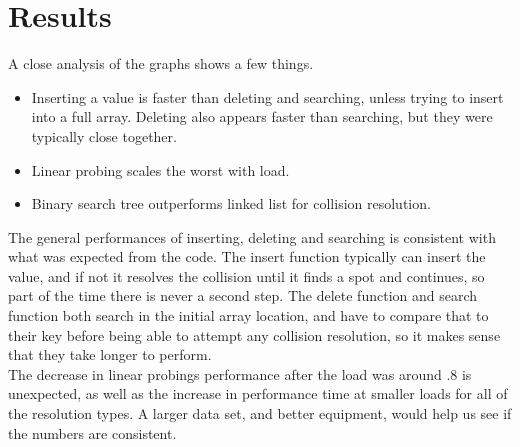 \documentclass[11pt]{article}
\theoremstyle{definition}
\numberwithin{equation}{section}
\begin{document}
\section{Results}
	A close analysis of the graphs shows a few things. 
	\begin{itemize}
		\item Inserting a value is faster than deleting and searching, unless trying to insert into a full array. Deleting also appears faster than searching, but they were typically close together. 
		\item Linear probing scales the worst with load.
		\item Binary search tree outperforms linked list for collision resolution.
	\end{itemize}
	
	The general performances of inserting, deleting and searching is consistent with what was expected from the code. The insert function typically can insert the value, and if not it resolves the collision until it finds a spot and continues, so part of the time there is never a second step. The delete function and search function both search in the initial array location, and have to compare that to their key before being able to attempt any collision resolution, so it makes sense that they take longer to perform. 
\\
	The decrease in linear probings performance after the load was around .8 is unexpected, as well as the increase in performance time at smaller loads for all of the resolution types. A larger data set, and better equipment, would help us see if the numbers are consistent.
\end{document}
